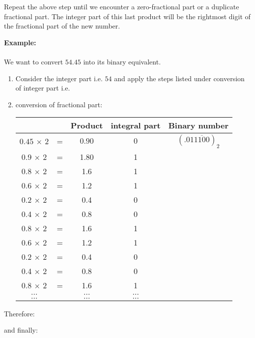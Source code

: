 	Repeat the above step until we encounter a zero-fractional part or a duplicate fractional part. The integer part of this last product will be the rightmost digit of the fractional part of the new number.
	
	\begin{tcolorbox}[colframe=black,colback=white,sharp corners]
	\textbf{{\Large {}}Example:}\\\\
	We want to convert $54.45$ into its binary equivalent.\\
	
	\begin{enumerate}
		\item Consider the integer part i.e. $54$ and apply the steps listed under conversion of integer part i.e.

		\item conversion of fractional part:
		\vskip 10pt
	
		\begin{center}
			\begin{tabular}{ccccc}
			                  &   &  Product & integral part &
			Binary number \\ \hline $0.45$ $\times$ $2$   & = &  $0.90$    &   $0$ &
			$(.01\overline{1100})_2$ \\
			0.9 $\times$ 2   & = &  1.80    &    1 &  \\
			0.8 $\times$ 2   & = &  1.6     &    1 &  \\
			0.6 $\times$ 2   & = &  1.2     &    1 &  \\
			0.2 $\times$ 2   & = &  0.4     &    0 &  \\
			0.4 $\times$ 2   & = &  0.8     &    0 &  \\
			0.8 $\times$ 2   & = &  1.6     &    1 &  \\
			0.6 $\times$ 2   & = &  1.2     &    1 &  \\
			0.2 $\times$ 2   & = &  0.4     &    0 &  \\
			0.4 $\times$ 2   & = &  0.8     &    0 &  \\
			0.8 $\times$ 2   & = &  1.6     &    1 &  \\
			$\dots$          &   &  $\dots$ &    $\dots$ &  \\
			$\dots$          &   &  $\dots$ &    $\dots$ &  \\
			\hline
			\end{tabular}
		\end{center}
	\end{enumerate} 
	Therefore:
	
	and finally:
	
	\end{tcolorbox}
	

